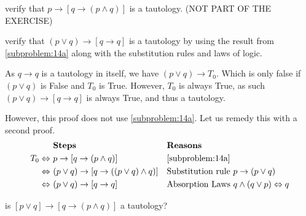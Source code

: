 \documentclass[a4paper, english, 12pt]{article} %
\begin{document}
\begin{subproblem}
  \label{subproblem:14a}
  verify that $p \to [q \to (p \wedge q)]$ is a tautology. (NOT PART OF THE EXERCISE)
\end{subproblem} 

\begin{subproblem}[2]
  verify that $(p \vee q) \to [q \to q]$ is a tautology by using the result from
  \cref{subproblem:14a} along with the substitution rules and laws of logic.
\end{subproblem}

\begin{answer}
 As $q \to q$ is a tautology in itself, we have $ (p \vee q) \to T_0$. Which is
 only false if $(p \vee q)$ is False and $T_0$ is True. However, $T_0$ is always
 True, as such $(p \vee q) \to [q \to q]$ is always True, and thus a tautology.

 However, this proof does not use \cref{subproblem:14a}. Let us remedy this with
 a second proof.
   \begin{align*}
      & \textbf{Steps} && \textbf{Reasons} \\
     T_0 \Leftrightarrow \ & p \to [q \to (p \wedge q)] 
     && \text{\Cref{subproblem:14a}}  \\
     \Leftrightarrow \ & (p \vee q) \to [q \to ((p \vee q) \wedge q)]
     && \text{Substitution rule $p \to (p \vee q)$} \\
     \Leftrightarrow \ & (p \vee q) \to [q \to q]
     && \text{Absorption Laws $q \wedge (q \vee p)\Leftrightarrow q$} \\
  \end{align*}

\end{answer}

\begin{subproblem}
  \label{subproblem:14c}
  is $[p \vee q] \to [q \to (p \wedge q)]$ a tautology?
\end{subproblem}
\end{document}
